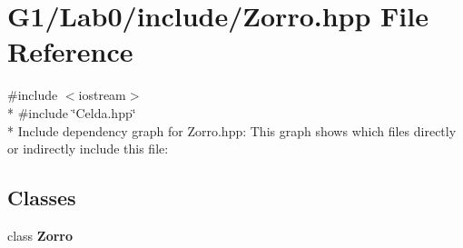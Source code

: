 \section{G1/\+Lab0/include/\+Zorro.hpp File Reference}
\label{_zorro_8hpp}
{\ttfamily \#include $<$iostream$>$}\\*
{\ttfamily \#include \char`\"{}Celda.\+hpp\char`\"{}}\\*
Include dependency graph for Zorro.\+hpp\+:
This graph shows which files directly or indirectly include this file\+:
\subsection*{Classes}
\begin{DoxyCompactItemize}
\item 
class {\bf Zorro}
\end{DoxyCompactItemize}

